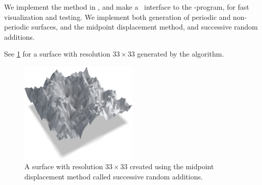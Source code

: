 We implement the method in \cpp, and make a \matlab\ interface to the \cpp-program, for fast visualization and testing. We implement both generation of periodic and non-periodic surfaces, and the midpoint displacement method, and successive random additions. 

See \cref{fig:diamond_square_surface} for a surface with resolution $33\times 33$ generated by the algorithm.%
%
\begin{figure}[htpb]%
    \centering%
    \includegraphics[width=0.5\textwidth]{./images/diamond_square/surface_blender/surface_composite01_cropped.png}%
    \caption{%
        A surface with resolution $33\times 33$ created using the midpoint displacement method called successive random additions.%
        \label{fig:diamond_square_surface}%
    }%
\end{figure}%
%
% 

